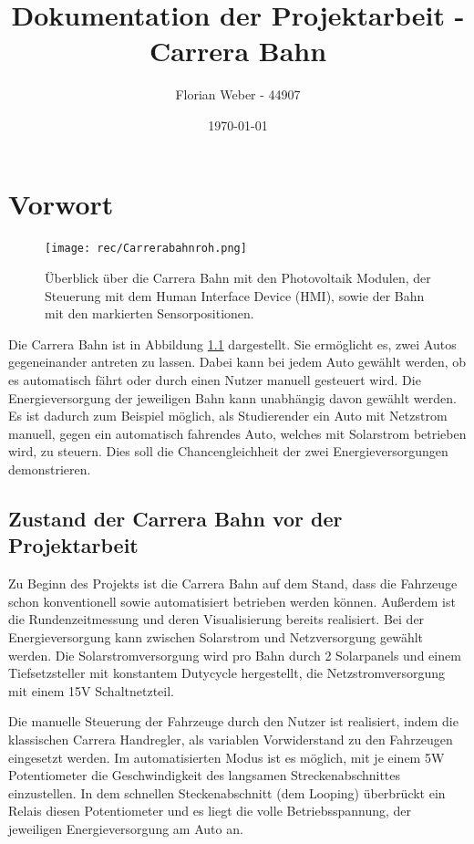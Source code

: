 \documentclass[a4paper, 11pt]{report}
\title{Dokumentation der Projektarbeit - Carrera Bahn}
\author{Florian Weber - 44907}
\date{\today}
\begin{document}
\maketitle	%


\tableofcontents 	%
\listoffigures		%
\newpage

\chapter{Vorwort}%
	\begin{figure}[tb]
	\centering
	\texttt{[image: rec/Carrerabahnroh.png]}
	\caption[Überblick über die Carrera Bahn]{Überblick über die Carrera Bahn mit den Photovoltaik Modulen, der Steuerung mit dem Human Interface Device (HMI), sowie der Bahn mit den markierten Sensorpositionen.}
	\label{img:carrerakomplett}
	\end{figure}
Die Carrera Bahn ist in Abbildung \ref{img:carrerakomplett} dargestellt. Sie ermöglicht es, zwei Autos gegeneinander antreten zu lassen. Dabei kann bei jedem Auto gewählt werden, ob es automatisch fährt oder durch einen Nutzer manuell gesteuert wird. Die Energieversorgung der jeweiligen Bahn kann unabhängig davon gewählt werden. Es ist dadurch zum Beispiel möglich, als Studierender ein Auto mit Netzstrom manuell, gegen ein automatisch fahrendes Auto, welches mit Solarstrom betrieben wird, zu steuern.
 Dies soll die Chancengleichheit der zwei Energieversorgungen demonstrieren. %

\section{Zustand der Carrera Bahn vor der Projektarbeit}\label{sec:before}
Zu Beginn des Projekts ist die Carrera Bahn auf dem Stand, dass die Fahrzeuge schon konventionell sowie automatisiert betrieben werden können. Außerdem ist die Rundenzeitmessung und deren Visualisierung bereits realisiert. Bei der Energieversorgung kann zwischen Solarstrom und Netzversorgung gewählt werden.
Die Solarstromversorgung wird pro Bahn durch 2 Solarpanels und einem Tiefsetzsteller mit konstantem Dutycycle hergestellt, die Netzstromversorgung mit einem 15V Schaltnetzteil.

Die manuelle Steuerung der Fahrzeuge durch den Nutzer ist realisiert, indem die klassischen Carrera Handregler, als variablen Vorwiderstand zu den Fahrzeugen eingesetzt werden. Im automatisierten Modus ist es möglich, mit je einem 5W Potentiometer die Geschwindigkeit des langsamen Streckenabschnittes einzustellen. In dem schnellen Steckenabschnitt (dem Looping) überbrückt ein Relais diesen Potentiometer und es liegt die volle Betriebsspannung, der jeweiligen Energieversorgung am Auto an.
\newpage
\end{document}
